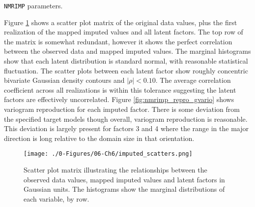 \begin{table}[!htb]
    \centering
    \caption{\texttt{NMRIMP} parameters.}
    \resizebox{0.9\width}{!}{}
    \label{tab:imp_pars}
\end{table}

Figure \ref{fig:imputed_scatters} shows a scatter plot matrix of the original data values, plus the first realization of the mapped imputed values and all latent factors. The top row of the matrix is somewhat redundant, however it shows the perfect correlation between the observed data and mapped imputed values. The marginal histograms show that each latent distribution is standard normal, with reasonable statistical fluctuation. The scatter plots between each latent factor show roughly concentric bivariate Gaussian density contours and $|\rho| < 0.10$. The average correlation coefficient across all realizations is within this tolerance suggesting the latent factors are effectively uncorrelated. Figure \ref{fig:nmrimp_repro_gvario} shows variogram reproduction for each imputed factor. There is some deviation from the specified target models though overall, variogram reproduction is reasonable. This deviation is largely present for factors 3 and 4 where the range in the major direction is long relative to the domain size in that orientation.

\begin{figure}[htb!]
    \centering
    \texttt{[image: ./0-Figures/06-Ch6/imputed\_scatters.png]}
    \caption{Scatter plot matrix illustrating the relationships between the observed data values, mapped imputed values and latent factors in Gaussian units. The histograms show the marginal distributions of each variable, by row. }
    \label{fig:imputed_scatters}
\end{figure}

